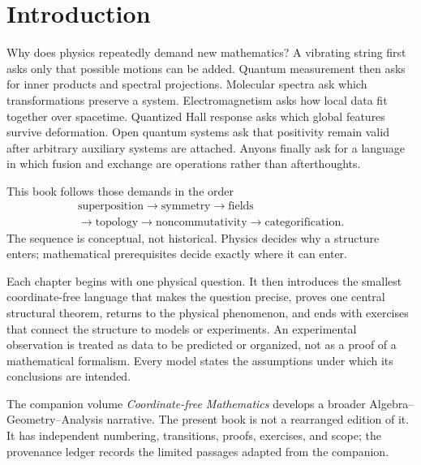 \chapter*{Introduction}

Why does physics repeatedly demand new mathematics?  A vibrating string first
asks only that possible motions can be added.  Quantum measurement then asks
for inner products and spectral projections.  Molecular spectra ask which
transformations preserve a system.  Electromagnetism asks how local data fit
together over spacetime.  Quantized Hall response asks which global features
survive deformation.  Open quantum systems ask that positivity remain valid
after arbitrary auxiliary systems are attached.  Anyons finally ask for a
language in which fusion and exchange are operations rather than afterthoughts.

This book follows those demands in the order
\[
\begin{gathered}
\text{superposition}\longrightarrow\text{symmetry}\longrightarrow
\text{fields}\\[-2pt]
\longrightarrow\text{topology}\longrightarrow\text{noncommutativity}
\longrightarrow\text{categorification}.
\end{gathered}
\]
The sequence is conceptual, not historical.  Physics decides why a structure
enters; mathematical prerequisites decide exactly where it can enter.

Each chapter begins with one physical question.  It then introduces the
smallest coordinate-free language that makes the question precise, proves one
central structural theorem, returns to the physical phenomenon, and ends with
exercises that connect the structure to models or experiments.  An
experimental observation is treated as data to be predicted or organized,
not as a proof of a mathematical formalism.  Every model states the
assumptions under which its conclusions are intended.

The companion volume \emph{Coordinate-free Mathematics} develops a broader
Algebra--Geometry--Analysis narrative.  The present book is not a rearranged
edition of it.  It has independent numbering, transitions, proofs, exercises,
and scope; the provenance ledger records the limited passages adapted from
the companion.
